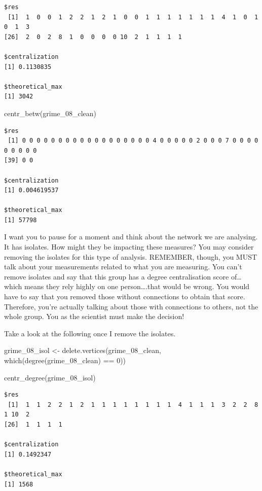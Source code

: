 \documentclass[
  letterpaper,
  DIV=11,
  numbers=noendperiod]{scrreprt}
\newenvironment{Shaded}{\begin{snugshade}}{\end{snugshade}}
\newcommand{\DecValTok}[1]{\textcolor[rgb]{0.68,0.00,0.00}{#1}}
\newcommand{\FunctionTok}[1]{\textcolor[rgb]{0.28,0.35,0.67}{#1}}
\newcommand{\NormalTok}[1]{\textcolor[rgb]{0.00,0.23,0.31}{#1}}
\newcommand{\OtherTok}[1]{\textcolor[rgb]{0.00,0.23,0.31}{#1}}
\newcommand{\SpecialCharTok}[1]{\textcolor[rgb]{0.37,0.37,0.37}{#1}}
\begin{document}
\begin{verbatim}
$res
 [1]  1  0  0  1  2  2  1  2  1  0  0  1  1  1  1  1  1  1  4  1  0  1  0  1  3
[26]  2  0  2  8  1  0  0  0  0 10  2  1  1  1  1

$centralization
[1] 0.1130835

$theoretical_max
[1] 3042
\end{verbatim}

\begin{Shaded}
\begin{Highlighting}[]
\FunctionTok{centr\_betw}\NormalTok{(grime\_08\_clean)}
\end{Highlighting}
\end{Shaded}

\begin{verbatim}
$res
 [1] 0 0 0 0 0 0 0 0 0 0 0 0 0 0 0 0 0 0 4 0 0 0 0 0 2 0 0 0 7 0 0 0 0 0 0 0 0 0
[39] 0 0

$centralization
[1] 0.004619537

$theoretical_max
[1] 57798
\end{verbatim}

I want you to pause for a moment and think about the network we are
analysing. It has isolates. How might they be impacting these measures?
You may consider removing the isolates for this type of analysis.
REMEMBER, though, you MUST talk about your measurements related to what
you are measuring. You can't remove isolates and say that this group has
a degree centralisation score of\ldots{} which means they rely highly on
one person\ldots.that would be wrong. You would have to say that you
removed those without connections to obtain that score. Therefore,
you're actually talking about those with connections to others, not the
whole group. You as the scientist must make the decision!

Take a look at the following once I remove the isolates.

\begin{Shaded}
\begin{Highlighting}[]
\NormalTok{grime\_08\_isol }\OtherTok{\textless{}{-}} \FunctionTok{delete.vertices}\NormalTok{(grime\_08\_clean, }\FunctionTok{which}\NormalTok{(}\FunctionTok{degree}\NormalTok{(grime\_08\_clean) }\SpecialCharTok{==} \DecValTok{0}\NormalTok{)) }

\FunctionTok{centr\_degree}\NormalTok{(grime\_08\_isol)}
\end{Highlighting}
\end{Shaded}

\begin{verbatim}
$res
 [1]  1  1  2  2  1  2  1  1  1  1  1  1  1  1  4  1  1  1  3  2  2  8  1 10  2
[26]  1  1  1  1

$centralization
[1] 0.1492347

$theoretical_max
[1] 1568
\end{verbatim}
\end{document}
